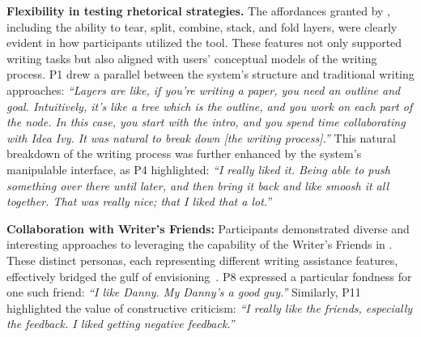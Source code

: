 \textbf{Flexibility in testing rhetorical strategies.} The affordances granted by \system, including the ability to tear, split, combine, stack, and fold layers, were clearly evident in how participants utilized the tool. These features not only supported writing tasks but also aligned with users' conceptual models of the writing process. P1 drew a parallel between the system's structure and traditional writing approaches: \textit{``Layers are like, if you're writing a paper, you need an outline and goal. Intuitively, it's like a tree which is the outline, and you work on each part of the node. In this case, you start with the intro, and you spend time collaborating with Idea Ivy. It was natural to break down [the writing process].''} This natural breakdown of the writing process was further enhanced by the system's manipulable interface, as P4 highlighted: \textit{``I really liked it. Being able to push something over there until later, and then bring it back and like smoosh it all together. That was really nice; that I liked that a lot.''} 


\textbf{Collaboration with Writer's Friends:} Participants demonstrated diverse and interesting approaches to leveraging the capability of the Writer's Friends in \system. These distinct personas, each representing different writing assistance features, effectively bridged the gulf of envisioning~\cite{subramonyam2024bridging}. P8 expressed a particular fondness for one such friend: \textit{``I like Danny. My Danny's a good guy.''} Similarly, P11 highlighted the value of constructive criticism: \textit{``I really like the friends, especially the feedback. I liked getting negative feedback.''}  

